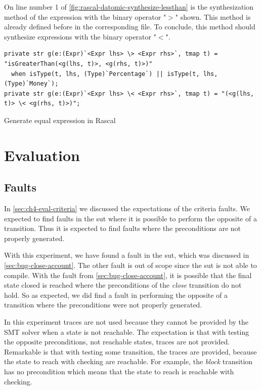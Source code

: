 On line number 1 of \autoref{fig:rascal-datomic-synthesize-lessthan} is the
synthesization method of the expression with the binary operator "$>$" shown.
This method is already defined before in the corresponding file. To conclude,
this method should synthesize expressions with the binary operator "$<$".

\begin{sourcecode}[h!]
\begin{lstlisting}[]
private str g(e:(Expr)`<Expr lhs> \> <Expr rhs>`, tmap t) = "isGreaterThan(<g(lhs, t)>, <g(rhs, t)>)"
  when isType(t, lhs, (Type)`Percentage`) || isType(t, lhs, (Type)`Money`);
private str g(e:(Expr)`<Expr lhs> \< <Expr rhs>`, tmap t) = "(<g(lhs, t)> \< <g(rhs, t)>)";
\end{lstlisting}
\caption{Generate equal expression in Rascal}\label{fig:rascal-datomic-synthesize-lessthan}
\end{sourcecode}
\FloatBarrier

\section{Evaluation}\label{sec:ch4-evaluation}

\subsection{Faults}
In \autoref{sec:ch4-eval-criteria} we discussed the expectations of the criteria
faults. We expected to find faults in the \gls{sut} where it is possible to perform
the opposite of a transition. Thus it is expected to find faults where the
preconditions are not properly generated.

With this experiment, we have found a fault in the \gls{sut}, which was
discussed in \autoref{sec:bug-close-account}. The other fault is out of scope
since the \gls{sut} is not able to compile. With the fault from
\autoref{sec:bug-close-account}, it is possible that the final state closed is
reached where the preconditions of the \textit{close} transition do not hold.
So as expected, we did find a fault in performing the opposite of a transition
where the preconditions were not properly generated.

In this experiment traces are not used because they cannot be provided by the
\gls{SMT} solver when a state is not reachable. The expectation is that with
testing the opposite preconditions, not reachable states, traces are not
provided. Remarkable is that with testing some transition, the traces are
provided, because the state to reach with checking are reachable. For example,
the \textit{block} transition has no precondition which means that the state to
reach is reachable with checking.

